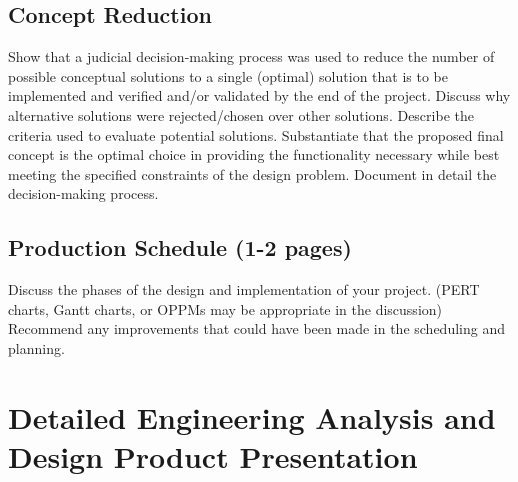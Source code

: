 \documentclass[12pt]{article}
\begin{document}
\subsection{Concept Reduction}
Show that a judicial decision-making process was used to reduce the number of possible conceptual solutions to a single (optimal) solution that is to be implemented and verified and/or validated by the end of the project. Discuss why alternative solutions were rejected/chosen over other solutions. Describe the criteria used to evaluate potential solutions. Substantiate that the proposed final concept is the optimal choice in providing the functionality necessary while best meeting the specified constraints of the design problem. Document in detail the decision-making process.

\subsection{Production Schedule (1-2 pages)}
Discuss the phases of the design and implementation of your project. (PERT charts, Gantt charts, or OPPMs may be appropriate in the discussion) Recommend any improvements that could have been made in the scheduling and planning.

\section{Detailed Engineering Analysis and Design Product Presentation}
\end{document}
